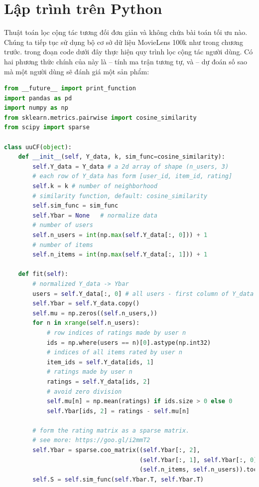 \section{Lập trình trên Python }
\label{sec:24_python}
Thuật toán lọc cộng tác tương đối đơn giản và không
chứa bài toán tối ưu nào. Chúng ta tiếp tục sử dụng bộ cơ sở dữ liệu MovieLens
100k như trong chương trước.  trong đoạn code dưới đây thực hiện quy trình lọc cộng tác người dùng. Có hai phương thức chính của
 này là  -- tính ma trận tương tự, và
 -- dự đoán số sao mà một người dùng sẽ đánh giá một
sản phẩm:
\newpage
\begin{lstlisting}[language=Python]
from __future__ import print_function
import pandas as pd
import numpy as np
from sklearn.metrics.pairwise import cosine_similarity
from scipy import sparse

class uuCF(object):
    def __init__(self, Y_data, k, sim_func=cosine_similarity):
        self.Y_data = Y_data # a 2d array of shape (n_users, 3)
        # each row of Y_data has form [user_id, item_id, rating]
        self.k = k # number of neighborhood
        # similarity function, default: cosine_similarity
        self.sim_func = sim_func
        self.Ybar = None   # normalize data
        # number of users
        self.n_users = int(np.max(self.Y_data[:, 0])) + 1
        # number of items
        self.n_items = int(np.max(self.Y_data[:, 1])) + 1

    def fit(self):
        # normalized Y_data -> Ybar
        users = self.Y_data[:, 0] # all users - first column of Y_data
        self.Ybar = self.Y_data.copy()
        self.mu = np.zeros((self.n_users,))
        for n in xrange(self.n_users):
            # row indices of ratings made by user n
            ids = np.where(users == n)[0].astype(np.int32)
            # indices of all items rated by user n
            item_ids = self.Y_data[ids, 1]
            # ratings made by user n
            ratings = self.Y_data[ids, 2]
            # avoid zero division
            self.mu[n] = np.mean(ratings) if ids.size > 0 else 0
            self.Ybar[ids, 2] = ratings - self.mu[n]

        # form the rating matrix as a sparse matrix.
        # see more: https://goo.gl/i2mmT2
        self.Ybar = sparse.coo_matrix((self.Ybar[:, 2],
                                      (self.Ybar[:, 1], self.Ybar[:, 0])),
                                      (self.n_items, self.n_users)).tocsr()
        self.S = self.sim_func(self.Ybar.T, self.Ybar.T)


\end{lstlisting}
